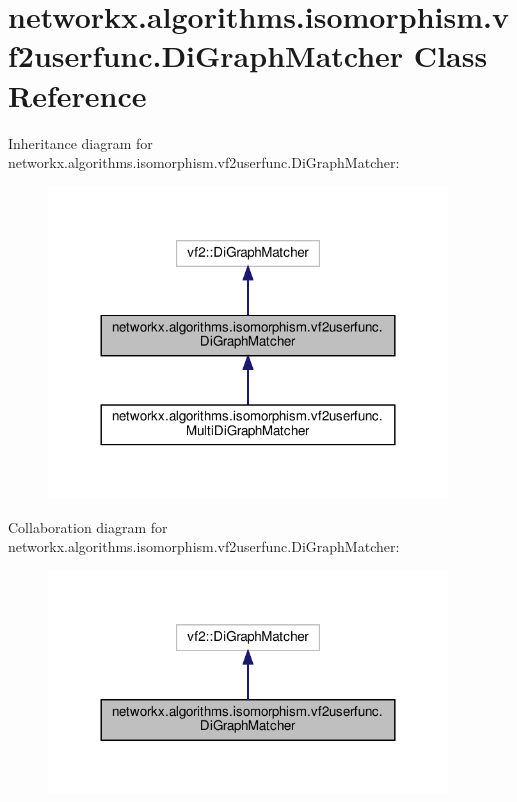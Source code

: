 \hypertarget{classnetworkx_1_1algorithms_1_1isomorphism_1_1vf2userfunc_1_1DiGraphMatcher}{}\section{networkx.\+algorithms.\+isomorphism.\+vf2userfunc.\+Di\+Graph\+Matcher Class Reference}
\label{classnetworkx_1_1algorithms_1_1isomorphism_1_1vf2userfunc_1_1DiGraphMatcher}


Inheritance diagram for networkx.\+algorithms.\+isomorphism.\+vf2userfunc.\+Di\+Graph\+Matcher\+:
\nopagebreak
\begin{figure}[H]
\begin{center}
\leavevmode
\includegraphics[width=300pt]{classnetworkx_1_1algorithms_1_1isomorphism_1_1vf2userfunc_1_1DiGraphMatcher__inherit__graph}
\end{center}
\end{figure}


Collaboration diagram for networkx.\+algorithms.\+isomorphism.\+vf2userfunc.\+Di\+Graph\+Matcher\+:
\nopagebreak
\begin{figure}[H]
\begin{center}
\leavevmode
\includegraphics[width=300pt]{classnetworkx_1_1algorithms_1_1isomorphism_1_1vf2userfunc_1_1DiGraphMatcher__coll__graph}
\end{center}
\end{figure}
